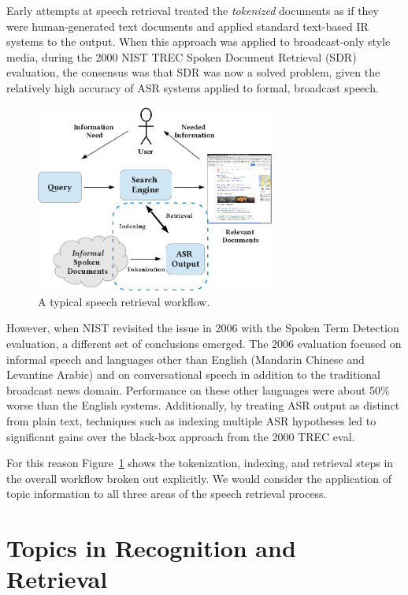 Early attempts at speech retrieval treated the \textit{tokenized} documents as if they were human-generated text documents and applied standard text-based IR systems to the output.  When this approach was applied to broadcast-only style media, during the 2000 NIST TREC Spoken Document Retrieval (SDR) evaluation\cite{trec2000}, the consensus was that SDR was now a solved problem, given the relatively high accuracy of ASR systems applied to formal, broadcast speech.

\begin{figure}
 \centering
 \includegraphics[width=0.7\textwidth]{sdr.png}
 \caption[Typical speech retrieval workflow]{A typical speech retrieval workflow. \label{fig:sdr}}
\end{figure}

However, when NIST revisited the issue in 2006 with the Spoken Term Detection evaluation\cite{std06eval}, a different set of conclusions emerged.  The 2006 evaluation focused on informal speech and languages other than English (Mandarin Chinese and Levantine Arabic) and on conversational speech in addition to the traditional broadcast news domain.  Performance on these other languages were about 50\% worse than the English systems.  Additionally, by treating ASR output as distinct from plain text, techniques such as indexing multiple ASR hypotheses led to significant gains over the black-box approach from the 2000 TREC eval.\cite{fiscus2007}  

For this reason Figure~\ref{fig:sdr} shows the tokenization, indexing, and retrieval steps in the overall workflow broken out explicitly.  We would consider the application of topic information to all three areas of the speech retrieval process.
 

 
\section{Topics in Recognition and Retrieval}

